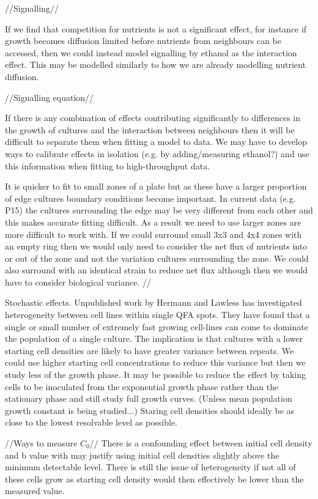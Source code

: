 //Signalling//

If we find that competition for nutrients is not a significant effect,
for instance if growth becomes diffusion limited before nutrients from
neighbours can be accessed, then we could instead model signalling by
ethanol as the interaction effect. This may be modelled similarly to
how we are already modelling nutrient diffusion.

//Signalling equation//

If there is any combination of effects contributing significantly to
differences in the growth of cultures and the interaction between
neighbours then it will be difficult to separate them when fitting a
model to data. We may have to develop ways to calibrate effects in
isolation (e.g. by adding/measuring ethanol?) and use this information
when fitting to high-throughput data.

It is quicker to fit to small zones of a plate but as these have a
larger proportion of edge cultures boundary conditions become
important. In current data (e.g. P15) the cultures surrounding the
edge may be very different from each other and this makes accurate
fitting difficult. As a result we need to use larger zones are more
difficult to work with. If we could surround small 3x3 and 4x4 zones
with an empty ring then we would only need to consider the net flux of
nutrients into or out of the zone and not the variation cultures
surrounding the zone. We could also surround with an identical strain
to reduce net flux although then we would have to consider biological
variance.
//

Stochastic effects. Unpublished work by Hermann and Lawless has
investigated heterogeneity between cell lines within single QFA
spots. They have found that a single or small number of extremely fast
growing cell-lines can come to dominate the population of a single
culture. The implication is that cultures with a lower starting cell
densities are likely to have greater variance between repeats. We
could use higher starting cell concentrations to reduce this variance
but then we study less of the growth phase. It may be possible to
reduce the effect by taking cells to be inoculated from the
exponential growth phase rather than the stationary phase and still
study full growth curves. (Unless mean population growth constant is
being studied...) Staring cell densities should ideally be as close to
the lowest resolvable level as possible.

//Ways to measure \(C_{0}\)// There is a confounding effect between
initial cell density and b value with may justify using initial cell
densities slightly above the minimum detectable level. There is still
the issue of heterogeneity if not all of these cells grow as starting
cell density would then effectively be lower than the measured value.

